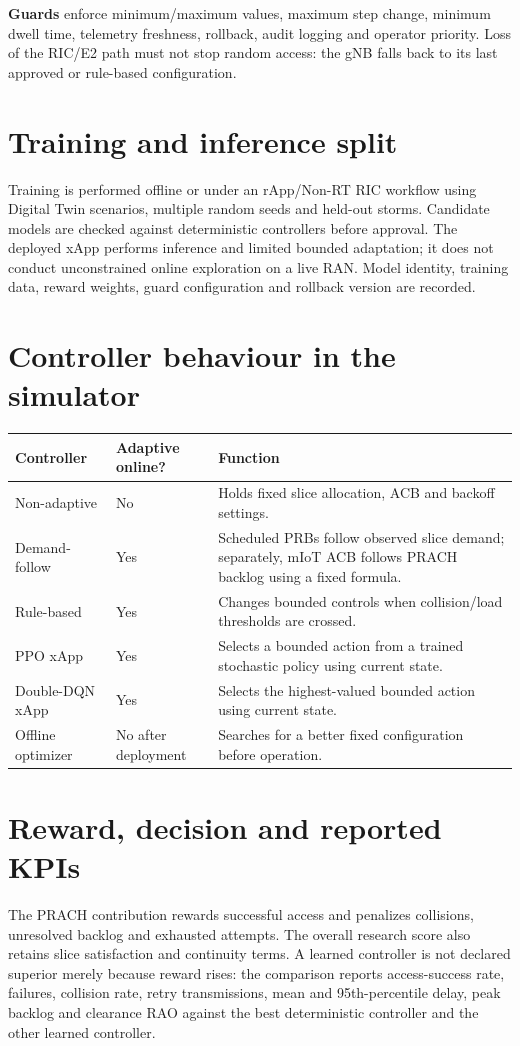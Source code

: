 \documentclass[10pt]{article}
\begin{document}
\textbf{Guards} enforce minimum/maximum values, maximum step change, minimum dwell time, telemetry freshness, rollback, audit logging and operator priority. Loss of the RIC/E2 path must not stop random access: the gNB falls back to its last approved or rule-based configuration.

\section{Training and inference split}
Training is performed offline or under an rApp/Non-RT RIC workflow using Digital Twin scenarios, multiple random seeds and held-out storms. Candidate models are checked against deterministic controllers before approval. The deployed xApp performs inference and limited bounded adaptation; it does not conduct unconstrained online exploration on a live RAN. Model identity, training data, reward weights, guard configuration and rollback version are recorded.

\section{Controller behaviour in the simulator}
\begin{tabular}{>{\raggedright\arraybackslash}p{}>{\raggedright\arraybackslash}p{}>{\raggedright\arraybackslash}p{}}
\toprule Controller & Adaptive online? & Function\\\midrule
Non-adaptive & No & Holds fixed slice allocation, ACB and backoff settings.\\
Demand-follow & Yes & Scheduled PRBs follow observed slice demand; separately, mIoT ACB follows PRACH backlog using a fixed formula.\\
Rule-based & Yes & Changes bounded controls when collision/load thresholds are crossed.\\
PPO xApp & Yes & Selects a bounded action from a trained stochastic policy using current state.\\
Double-DQN xApp & Yes & Selects the highest-valued bounded action using current state.\\
Offline optimizer & No after deployment & Searches for a better fixed configuration before operation.\\
\bottomrule\end{tabular}

\section{Reward, decision and reported KPIs}
The PRACH contribution rewards successful access and penalizes collisions, unresolved backlog and exhausted attempts. The overall research score also retains slice satisfaction and continuity terms. A learned controller is not declared superior merely because reward rises: the comparison reports access-success rate, failures, collision rate, retry transmissions, mean and 95th-percentile delay, peak backlog and clearance RAO against the best deterministic controller and the other learned controller.
\end{document}
